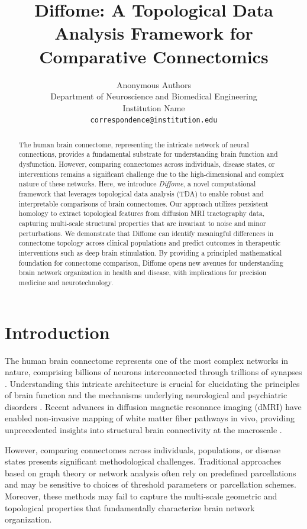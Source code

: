 \documentclass[12pt,a4paper]{article}
\title{\textbf{Diffome: A Topological Data Analysis Framework for Comparative Connectomics}}
\author{
    Anonymous Authors\\
    \small Department of Neuroscience and Biomedical Engineering\\
    \small Institution Name\\
    \small \texttt{correspondence@institution.edu}
}
\date{}
\begin{document}
\maketitle

\begin{abstract}
The human brain connectome, representing the intricate network of neural connections, provides a fundamental substrate for understanding brain function and dysfunction. However, comparing connectomes across individuals, disease states, or interventions remains a significant challenge due to the high-dimensional and complex nature of these networks. Here, we introduce \textit{Diffome}, a novel computational framework that leverages topological data analysis (TDA) to enable robust and interpretable comparisons of brain connectomes. Our approach utilizes persistent homology to extract topological features from diffusion MRI tractography data, capturing multi-scale structural properties that are invariant to noise and minor perturbations. We demonstrate that Diffome can identify meaningful differences in connectome topology across clinical populations and predict outcomes in therapeutic interventions such as deep brain stimulation. By providing a principled mathematical foundation for connectome comparison, Diffome opens new avenues for understanding brain network organization in health and disease, with implications for precision medicine and neurotechnology.
\end{abstract}

\section{Introduction}

The human brain connectome represents one of the most complex networks in nature, comprising billions of neurons interconnected through trillions of synapses \citep{johnson2021largescale}. Understanding this intricate architecture is crucial for elucidating the principles of brain function and the mechanisms underlying neurological and psychiatric disorders \citep{doe2021connectomics}. Recent advances in diffusion magnetic resonance imaging (dMRI) have enabled non-invasive mapping of white matter fiber pathways in vivo, providing unprecedented insights into structural brain connectivity at the macroscale \citep{wang2021vivo}.

However, comparing connectomes across individuals, populations, or disease states presents significant methodological challenges. Traditional approaches based on graph theory or network analysis often rely on predefined parcellations and may be sensitive to choices of threshold parameters or parcellation schemes. Moreover, these methods may fail to capture the multi-scale geometric and topological properties that fundamentally characterize brain network organization.
\end{document}
